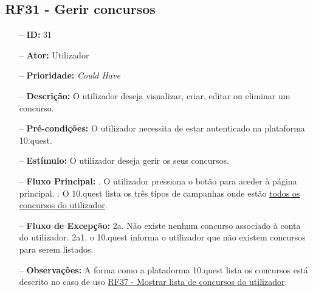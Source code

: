 \subsection{RF31 - Gerir concursos}
\begin{itemize}
	\item[--] \textbf{ID:} 31
	\item[--]  \textbf{Ator:} Utilizador
	\item[--]  \textbf{Prioridade:} \textit{Could Have}
	\item[--]  \textbf{Descrição:} O utilizador deseja visualizar, criar, editar ou eliminar um concurso.
	\item[--]  \textbf{Pré-condições:} O utilizador necessita de estar autenticado na plataforma 10.quest.
	\item[--]  \textbf{Estímulo:} O utilizador deseja gerir os seus concursos.
	\item[--]  \textbf{Fluxo Principal:} 
	. O utilizador pressiona o botão para aceder à página principal.
	. O 10.quest lista os três tipos de campanhas onde estão \underline{todos os concursos do utilizador}.
	\item[--]  \textbf{Fluxo de Excepção:} 
	\subitem 2a. Não existe nenhum concurso associado à conta do utilizador.
	\subitem 2a1. o 10.quest informa o utilizador que não existem concursos para serem listados.
	\item[--]  \textbf{Observações:} A forma como a platadorma 10.quest lista os concursos está descrito no caso de uso \underline{RF37 - Mostrar lista de concursos do utilizador}.
\end{itemize}
\newpage

